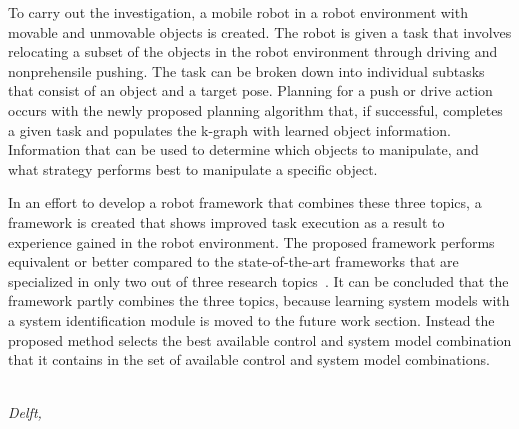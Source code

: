 To carry out the investigation, a mobile robot in a robot environment with movable and unmovable objects is created. The robot is given a task that involves relocating a subset of the objects in the robot environment through driving and nonprehensile pushing. The task can be broken down into individual subtasks that consist of an object and a target pose. Planning for a push or drive action occurs with the newly proposed planning algorithm that, if successful, completes a given task and populates the \acl{k-graph} with learned object information. Information that can be used to determine which objects to manipulate, and what strategy performs best to manipulate a specific object.\bs

In an effort to develop a robot framework that combines these three topics, a framework is created that shows improved task execution as a result to experience gained in the robot environment. The proposed framework performs equivalent or better compared to the state-of-the-art frameworks that are specialized in only two out of three research topics~\cite{wang_affordancebased_2020}. It can be concluded that the framework partly combines the three topics, because learning system models with a system identification module is moved to the future work section. Instead the proposed method selects the best available control and system model combination that it contains in the set of available control and system model combinations.\bs

\begin{flushright}
{\makeatletter\itshape
    \@author\\
    Delft, \monthname{} \the\year{}
\makeatother}
\end{flushright}
